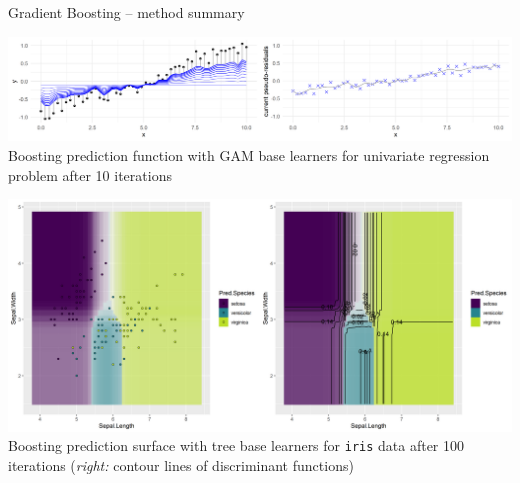 \begin{frame}{Gradient Boosting -- method summary}
\begin{minipage}{0.45\textwidth}
  \centering
  \includegraphics[width=\textwidth, trim=0 0 450 0, clip]{
  figure/illustration_gaussian_huber_2_10} \\
  \tiny{Boosting prediction function with GAM base learners for univariate 
  regression problem after 10 iterations}
\end{minipage}%
\hfill
\begin{minipage}{0.45\textwidth}
  \centering
  \includegraphics[width=\textwidth]{
  figure/boosting_multiclass_100} \\
  \tiny{Boosting prediction surface with tree base learners for \texttt{iris} 
  data after 100 iterations (\textit{right:} contour lines of discriminant 
  functions)}
\end{minipage}

\end{frame}


